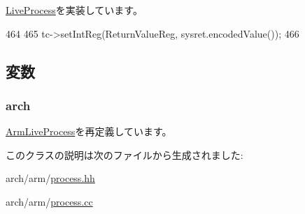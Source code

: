 \hyperlink{classLiveProcess_a5955e790542b86589b9fd75df24ec2d3}{LiveProcess}を実装しています。


\begin{DoxyCode}
464 {
465     tc->setIntReg(ReturnValueReg, sysret.encodedValue());
466 }
\end{DoxyCode}


\subsection{変数}
\hypertarget{classArmLiveProcess64_abf93aa1dd69df35e2a50f63d5a5d4c40}{
\subsubsection[{arch}]{ {\bf arch}}}
\label{classArmLiveProcess64_abf93aa1dd69df35e2a50f63d5a5d4c40}


\hyperlink{classArmLiveProcess_abf93aa1dd69df35e2a50f63d5a5d4c40}{ArmLiveProcess}を再定義しています。

このクラスの説明は次のファイルから生成されました:\begin{DoxyCompactItemize}
\item 
arch/arm/\hyperlink{arch_2arm_2process_8hh}{process.hh}\item 
arch/arm/\hyperlink{arch_2arm_2process_8cc}{process.cc}\end{DoxyCompactItemize}
